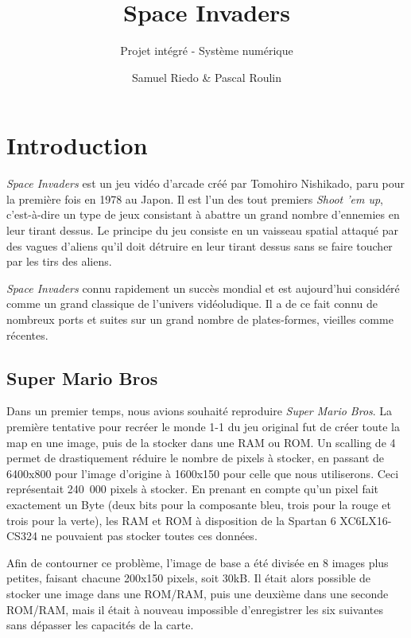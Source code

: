 \documentclass[french]{nakrule}
\author{Samuel Riedo \& Pascal Roulin}
\title{Space Invaders}
\subtitle{Projet intégré - Système numérique}
\begin{document}
\symmetricalPage
\tableofcontents
\asymmetricalPage
\clearpage

\chapter{Introduction}
\label{introduction}

\emph{Space Invaders} est un jeu vidéo d'arcade créé par Tomohiro Nishikado, paru pour
la première fois en 1978 au Japon. Il est l'un des tout premiers \emph{Shoot 'em
  up}, c'est-à-dire un type de jeux consistant à abattre un grand nombre d'ennemies en
leur tirant dessus. Le principe du jeu consiste en un vaisseau spatial attaqué
par des vagues d'aliens qu'il doit détruire en leur tirant dessus sans se faire
toucher par les tirs des aliens.

\emph{Space Invaders} connu rapidement un succès mondial et est aujourd'hui
considéré comme un grand classique de l'univers vidéoludique. Il a de ce fait
connu de nombreux ports et suites sur un grand nombre de plates-formes, vieilles
comme récentes.

\section{Super Mario Bros}
\label{sec:mario}

Dans un premier temps, nous avions souhaité reproduire \emph{Super Mario Bros}.
La première tentative pour recréer le monde 1-1 du jeu original fut de créer
toute la map en une image, puis de la stocker dans une RAM ou ROM.
Un scalling de 4 permet de drastiquement réduire le nombre de pixels à stocker,
en passant de 6400x800 pour l'image d'origine à 1600x150 pour celle que nous
utiliserons.
Ceci représentait \si{240.000} pixels à stocker. En prenant en compte qu'un pixel
fait exactement un Byte (deux bits pour la composante bleu, trois pour la rouge
et trois pour la verte), les RAM et ROM à disposition de la Spartan 6
XC6LX16-CS324 ne pouvaient pas stocker toutes ces données.

Afin de contourner ce problème, l'image de base a été divisée en 8 images plus
petites, faisant chacune 200x150 pixels, soit 30kB. Il était alors possible de
stocker une image dans une ROM/RAM, puis une deuxième dans une seconde ROM/RAM,
mais il était à nouveau impossible d'enregistrer les six suivantes sans dépasser
les capacités de la carte.
\end{document}
